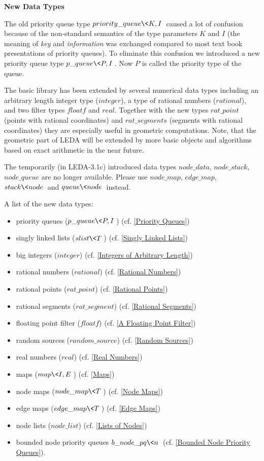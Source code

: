 \bigskip
{\bf New Data Types}

The old priority queue type $priority\_queue\<K,I\>$ caused
a lot of confusion because of the non-standard semantics of the type 
parameters $K$ and $I$ (the meaning of {\em key} and {\em information} 
was exchanged compared to most text book presentations of priority queues).
To eliminate this confusion we introduced a new priority queue type
$p\_queue\<P,I\>$. Now $P$ is called the priority type of the queue.

The basic library has been extended by several numerical data types
including an arbitrary length integer type ($integer$), a type of
rational numbers ($rational$), and two filter types $floatf$ and
$real$. Together with the new types $rat\_point$ (points with rational 
coordinates) and $rat\_segments$ (segments with rational coordinates) 
they are especially useful in geometric computations. Note, that the
geometric part of LEDA will be extended by more basic objects and
algorithms based on exact arithmetic in the near future.

The temporarily (in LEDA-3.1c) introduced data types $node\_data$,
$node\_stack$, $node\_queue$ are no longer available. Please use $node\_map$, 
$edge\_map$, $stack\<node\>$ and $queue\<node\>$ instead.

A list of the new data types:\\
\begin{itemize}
\item
priority queues     ($p\_queue\<P,I\>$) (cf. \ref{Priority Queues})
\item
singly linked lists ($slist\<T\>$)     (cf. \ref{Singly Linked Lists})
\item
big integers        ($integer$)        (cf. \ref{Integers of Arbitrary Length})
\item
rational numbers    ($rational$)       (cf. \ref{Rational Numbers})
\item
rational points     ($rat\_point$)     (cf. \ref{Rational Points})
\item
rational segments   ($rat\_segment$)   (cf. \ref{Rational Segments})
\item
floating point filter ($floatf$)       (cf. \ref{A Floating Point Filter})
\item
random sources      ($random\_source$) (cf. \ref{Random Sources})
\item
real numbers        ($real$)           (cf. \ref{Real Numbers})
\item
maps                ($map\<I,E\>$)     (cf. \ref{Maps})
\item
node  maps          ($node\_map\<T\>$) (cf. \ref{Node Maps})
\item
edge maps           ($edge\_map\<T\>$) (cf. \ref{Edge Maps})
\item
node lists          ($node\_list$)     (cf. \ref{Lists of Nodes})
\item
bounded node priority queues $b\_node\_pq\<n\>$ (cf. \ref{Bounded Node Priority Queues}).

\end{itemize}


